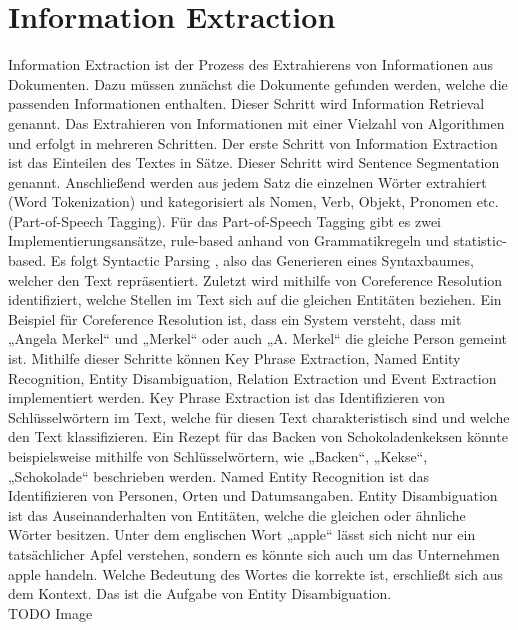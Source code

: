 \section{Information Extraction}
Information Extraction ist der Prozess des Extrahierens von Informationen aus Dokumenten.
Dazu müssen zunächst die Dokumente gefunden werden, welche die passenden Informationen enthalten.
Dieser Schritt wird Information Retrieval genannt.
Das Extrahieren von Informationen mit einer Vielzahl von Algorithmen und erfolgt in mehreren Schritten.
Der erste Schritt von Information Extraction ist das Einteilen des Textes in Sätze.
Dieser Schritt wird Sentence Segmentation genannt.
Anschließend werden aus jedem Satz die einzelnen Wörter extrahiert (Word Tokenization) und kategorisiert als Nomen, Verb, Objekt, Pronomen etc. (Part-of-Speech Tagging).
Für das Part-of-Speech Tagging gibt es zwei Implementierungsansätze, rule-based anhand von Grammatikregeln und statistic-based.
Es folgt Syntactic Parsing , also das Generieren eines Syntaxbaumes, welcher den Text repräsentiert.
Zuletzt wird mithilfe von Coreference Resolution identifiziert, welche Stellen im Text sich auf die gleichen Entitäten beziehen.
Ein Beispiel für Coreference Resolution ist, dass ein System versteht, dass mit „Angela Merkel“ und „Merkel“ oder auch „A.
Merkel“ die gleiche Person gemeint ist.
Mithilfe dieser Schritte können Key Phrase Extraction, Named Entity Recognition, Entity Disambiguation, Relation Extraction und Event Extraction implementiert werden.
Key Phrase Extraction ist das Identifizieren von Schlüsselwörtern im Text, welche für diesen Text charakteristisch sind und welche den Text klassifizieren.
Ein Rezept für das Backen von Schokoladenkeksen könnte beispielsweise mithilfe von Schlüsselwörtern, wie „Backen“, „Kekse“, „Schokolade“ beschrieben werden.
Named Entity Recognition ist das Identifizieren von Personen, Orten und Datumsangaben.
Entity Disambiguation ist das Auseinanderhalten von Entitäten, welche die gleichen oder ähnliche Wörter besitzen.
Unter dem englischen Wort „apple“ lässt sich nicht nur ein tatsächlicher Apfel verstehen, sondern es könnte sich auch um das Unternehmen apple handeln.
Welche Bedeutung des Wortes die korrekte ist, erschließt sich aus dem Kontext.
Das ist die Aufgabe von Entity Disambiguation.\\

TODO Image\\

